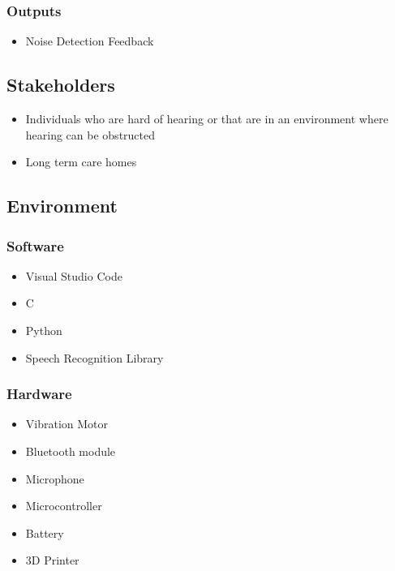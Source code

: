 \documentclass{article}
\begin{document}
\subsubsection {Outputs}
\begin{itemize}
    \item Noise Detection Feedback
\end{itemize}


\subsection{Stakeholders}
\begin{itemize}
    \item Individuals who are hard of hearing or that are in an environment where hearing can be obstructed
    \item Long term care homes
\end{itemize}

\subsection{Environment}
\subsubsection{Software}
\begin{itemize}
    \item Visual Studio Code
    \item C
    \item Python
    \item Speech Recognition Library
\end{itemize}
\subsubsection{Hardware}
\begin{itemize}
    \item Vibration Motor
    \item Bluetooth module
    \item Microphone
    \item Microcontroller
    \item Battery
    \item 3D Printer
\end{itemize}
\end{document}

